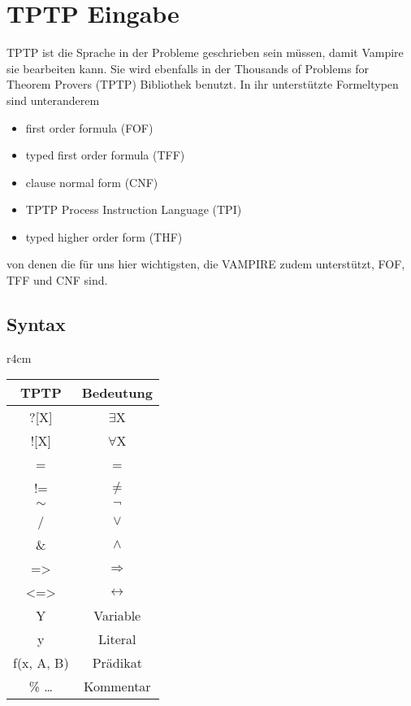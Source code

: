 \documentclass{article}
\begin{document}
\section{TPTP Eingabe}
\label{sec:input}

TPTP ist die Sprache in der Probleme geschrieben sein müssen, damit Vampire sie bearbeiten kann. Sie wird ebenfalls in der Thousands of Problems for Theorem Provers (TPTP) Bibliothek benutzt.
In ihr unterstützte Formeltypen sind unteranderem 
\begin{itemize}
	\item first order formula (FOF)
	\item typed first order formula (TFF)
	\item clause normal form (CNF)
	\item TPTP Process Instruction Language  (TPI)
	\item typed higher order form (THF)
\end{itemize}
von denen die für uns hier wichtigsten, die VAMPIRE zudem unterstützt, FOF, TFF und CNF sind.

\subsection{Syntax}
\label{subsec:syntax}


\begin{wraptable}{r}{4cm}
\begin{tabular}{|c|c|}
	\hline TPTP & Bedeutung \\ 
	\hline ?[X] & $\exists$X \\
	\hline ![X] & $\forall$X \\
	\hline = & = \\
	\hline != & $\neq$ \\
	\hline $\sim$ & $\lnot$ \\
	\hline / & $\lor$ \\
	\hline \& & $\land$ \\
	\hline => & $\Rightarrow$ \\
	\hline <=> & $\leftrightarrow$ \\
	\hline Y & Variable \\
	\hline y & Literal \\
	\hline f(x, A, B) & Prädikat \\
	\hline \% \dots & Kommentar \\
	\hline
\end{tabular} 
\end{wraptable}
\end{document}
